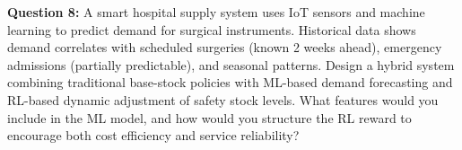 \documentclass{article}
\begin{document}
\textbf{Question 8:} A smart hospital supply system uses IoT sensors and machine learning to predict demand for surgical instruments. Historical data shows demand correlates with scheduled surgeries (known 2 weeks ahead), emergency admissions (partially predictable), and seasonal patterns. Design a hybrid system combining traditional base-stock policies with ML-based demand forecasting and RL-based dynamic adjustment of safety stock levels. What features would you include in the ML model, and how would you structure the RL reward to encourage both cost efficiency and service reliability?
\end{document}
